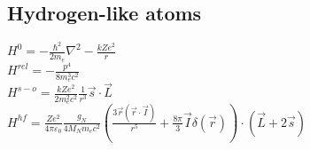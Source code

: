 \documentclass[letterpaper,landscape,10pt]{article}
\begin{document}
{\begin{multicols}{4}
  \subsection*{Hydrogen-like atoms}
	\hspace{5pt} $H^0 = -\frac{\hbar^2}{2m_e}\nabla^2-\frac{kZe^2}{r}$ \\
	\hspace{5pt} $H^{rel}=-\frac{p^4}{8m_e^3c^2}$ \\
	\hspace{5pt} $H^{s-o}=\frac{kZe^2}{2m_e^2c^2}\frac{1}{r^3}\vec{s}\cdot\vec{L}$ \\
	\hspace{5pt} $H^{hf}=\frac{Ze^2}{4\pi\varepsilon_0}\frac{g_N}{4M_Nm_ec^2}\left( \frac{3\vec{r}(\vec{r}\cdot\vec{I})}{r^5} + \frac{8\pi}{3}\vec{I}\delta(\vec{r}) \right)\cdot(\vec{L}+2\vec{s})$ \\
	\hspace{5pt} 
	\hspace{5pt} 



\end{multicols}
}
\end{document}
